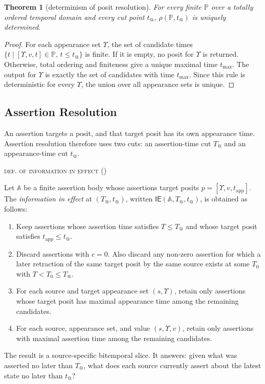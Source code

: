 \documentclass[a4paper,fleqn]{cas-sc}
\newcommand{\ie}{\mathsf{IE}}
\newcounter{majorcount}
\newcommand{\deffy}[3]{
	\vspace{2ex}
	\refstepcounter{majorcount}
	\noindent\textsc{#1} {\normalfont(\arabic{majorcount})}
	\\\begin{small}
	\noindent #2%
	\label{Def:#3}
	\end{small}
	\vspace{2ex}
}
\newenvironment{criteria}{%
  \begin{enumerate}
  \renewcommand{\labelenumi}{\footnotesize\arabic{enumi}}%
  \setlength{\itemsep}{0.3ex}%
  \setlength{\parsep}{0pt}%
}{%
  \end{enumerate}
}
\theoremstyle{plain}
\newtheorem{theorem}{Theorem}
\theoremstyle{remark}
\begin{document}
\begin{theorem}[determinism of posit resolution]
For every finite \(\mathbb{P}\) over a totally ordered temporal domain and every cut point \(t_@\), \(\rho(\mathbb{P},t_@)\) is uniquely determined.
\end{theorem}

\begin{proof}
For each appearance set \(\Upsilon\), the set of candidate times \(\{t\mid[\Upsilon,v,t]\in\mathbb{P},\,t\leq t_@\}\) is finite. If it is empty, no posit for \(\Upsilon\) is returned. Otherwise, total ordering and finiteness give a unique maximal time \(t_{\max}\). The output for \(\Upsilon\) is exactly the set of candidates with time \(t_{\max}\). Since this rule is deterministic for every \(\Upsilon\), the union over all appearance sets is unique.
\end{proof}

\subsection{Assertion Resolution}
An assertion targets a posit, and that target posit has its own appearance time. Assertion resolution therefore uses two cuts: an assertion-time cut \(T_@\) and an appearance-time cut \(t_@\).

\deffy{def. of information in effect}{%
Let \(\mathbb{A}\) be a finite assertion body whose assertions target posits \(p=[\Upsilon,v,t_{\mathrm{app}}]\). The \emph{information in effect} at \((T_@,t_@)\), written \(\ie(\mathbb{A},T_@,t_@)\), is obtained as follows:
\begin{criteria}
\item Keep assertions whose assertion time satisfies \(T\leq T_@\) and whose target posit satisfies \(t_{\mathrm{app}}\leq t_@\).
\item Discard assertions with \(c=0\). Also discard any non-zero assertion for which a later retraction of the same target posit by the same source exists at some \(T_0\) with \(T<T_0\leq T_@\).
\item For each source and target appearance set \((s,\Upsilon)\), retain only assertions whose target posit has maximal appearance time among the remaining candidates.
\item For each source, appearance set, and value \((s,\Upsilon,v)\), retain only assertions with maximal assertion time among the remaining candidates.
\end{criteria}}{effect}

The result is a source-specific bitemporal slice. It answers: given what was asserted no later than \(T_@\), what does each source currently assert about the latest state no later than \(t_@\)?
\end{document}
